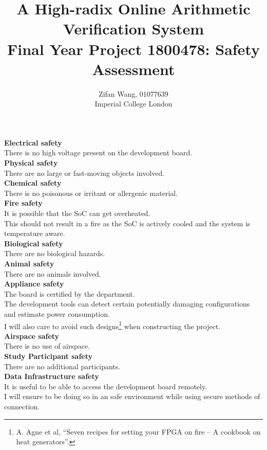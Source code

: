 \documentclass[11pt]{article}
\begin{document}
\title{%
  A High-radix Online Arithmetic Verification System\\
  \large Final Year Project 1800478: Safety Assessment}
\author{Zifan Wang, 01077639\\Imperial College London}

\maketitle

\textbf{Electrical safety}\\
There is no high voltage present on the development board.
\\

\textbf{Physical safety}\\
There are no large or fast-moving objects involved.
\\

\textbf{Chemical safety}\\
There is no poisonous or irritant or allergenic material.
\\

\textbf{Fire safety}\\
It is possible that the SoC can get overheated.\\
This should not result in a fire as the SoC is actively cooled and the system
is temperature aware.
\\

\textbf{Biological safety}\\
There are no biological hazards.
\\

\textbf{Animal safety}\\
There are no animals involved.
\\

\textbf{Appliance safety}\\
The board is certified by the department.\\
The development tools can detect certain potentially damaging
configurations and estimate power consumption.\\
I will also care to avoid such designs\footnote{A. Agne et al, ``Seven recipes
for setting your FPGA on fire -- A cookbook on heat generators''.} when
constructing the project.
\\

\textbf{Airspace safety}\\
There is no use of airspace.
\\

\textbf{Study Participant safety}\\
There are no additional participants.
\\

\textbf{Data Infrastructure safety}\\
It is useful to be able to access the development board remotely.\\
I will ensure to be doing so in an safe environment while using secure methods
of connection.
\end{document}
